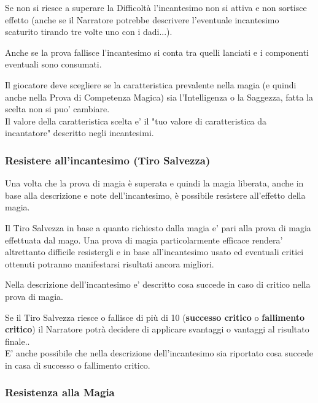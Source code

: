 Se non si riesce a superare la Difficoltà l'incantesimo non si attiva e non sortisce effetto (anche se il Narratore potrebbe descrivere l'eventuale incantesimo scaturito tirando tre volte uno con i dadi...).

Anche se la prova fallisce l'incantesimo si conta tra quelli lanciati e i componenti eventuali sono consumati.

Il giocatore deve scegliere se la caratteristica prevalente nella magia (e quindi anche nella Prova di Competenza Magica) sia l'Intelligenza o la Saggezza, fatta la scelta non si puo' cambiare.\\
Il valore della caratteristica scelta e' il "tuo valore di caratteristica da incantatore" descritto negli incantesimi.

\subsubsection{Resistere all'incantesimo (Tiro Salvezza)}

\label{resistere-allessenza-tiro-salvezza}

Una volta che la prova di magia è superata e quindi la magia liberata, anche in base alla descrizione e note dell'incantesimo, è possibile resistere all'effetto della magia.

Il Tiro Salvezza in base a quanto richiesto dalla magia e' pari alla prova di magia effettuata dal mago. Una prova di magia particolarmente efficace rendera' altrettanto difficile resistergli e in base all'incantesimo usato ed eventuali critici ottenuti potranno manifestarsi risultati ancora migliori.

Nella descrizione dell'incantesimo e' descritto cosa succede in caso di critico nella prova di magia.

Se il Tiro Salvezza riesce o fallisce di più di 10 (\textbf{successo critico} o \textbf{fallimento critico}) il Narratore potrà decidere di applicare svantaggi o vantaggi al risultato finale..\\
E' anche possibile che nella descrizione dell'incantesimo sia riportato cosa succede in casa di successo o fallimento critico.

\subsubsection{Resistenza alla Magia}

